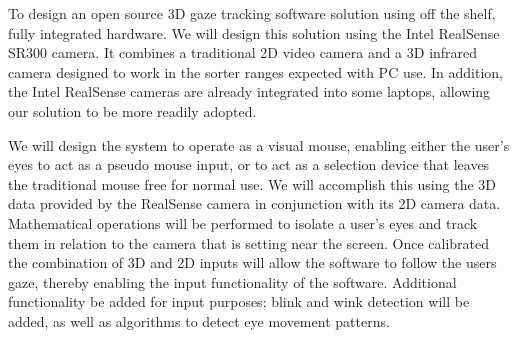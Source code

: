 
To design an open source 3D gaze tracking software solution using off the shelf, fully integrated hardware. We will design this solution using the Intel RealSense SR300 camera. It combines a traditional 2D video camera and a 3D infrared camera designed to work in the sorter ranges expected with PC use. In addition, the Intel RealSense cameras are already integrated into some laptops, allowing our solution to be more readily adopted. 

We will design the system to operate as a visual mouse, enabling either the user's eyes to act as a pseudo mouse input, or to act as a selection device that leaves the traditional mouse free for normal use. We will accomplish this using the 3D data provided by the RealSense camera in conjunction with its 2D camera data. Mathematical operations will be performed to isolate a user's eyes and track them in relation to the camera that is setting near the screen. Once calibrated the combination of 3D and 2D inputs will allow the software to follow the users gaze, thereby enabling the input functionality of the software. Additional functionality be added for input purposes; blink and wink detection will be added, as well as algorithms to detect eye movement patterns. 
